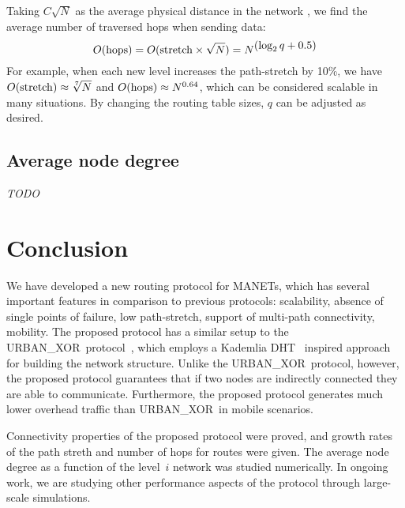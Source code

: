 \documentclass[conference]{IEEEtran}
\theoremstyle{definition}
\newcommand{\urbanxor}{URBAN\_XOR}
\begin{document}
Taking $C\sqrt{N}$ as the average physical distance in the network \cite{Kleinrock}, we find the average number of traversed hops when sending data:
\begin{equation*}
    O({\rm hops}) = O( {\rm stretch} \times \sqrt{N}) = N^{\displaystyle (\log_2 q + 0.5)}
\end{equation*}
For example, when each new level increases the path-stretch by 10\%, we have $O({\rm stretch}) \approx \sqrt[7]{N}$ and $O({\rm hops}) \approx N^{0.64}$, which can be considered scalable in many situations. By changing the routing table sizes, $q$ can be adjusted as desired.

\subsection{Average node degree}
\emph{TODO}


\section{Conclusion}
\label{sec:conclusion}

We have developed a new routing protocol for MANETs, which has several important features
in comparison to previous protocols:
scalability, absence of single points of failure, low path-stretch, support of multi-path connectivity, mobility.
The proposed protocol has a similar setup to the
\urbanxor\ protocol~\cite{Pasquini}, which employs a Kademlia DHT~\cite{kademlia} inspired approach for building the network structure.  Unlike the \urbanxor\ protocol, however, the proposed protocol guarantees that if two nodes
are indirectly connected they are able to communicate.  Furthermore, the proposed protocol generates much lower overhead
traffic than \urbanxor\ in mobile scenarios.  

Connectivity properties of the proposed protocol were proved, and growth rates of the path streth and number of hops for routes were given.  The average node degree as a function of the level~$i$ network was studied numerically.  In ongoing work, we are studying other performance aspects of the protocol through large-scale simulations.



\end{document}
